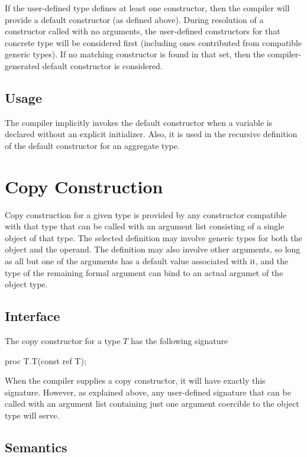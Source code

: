 If the user-defined type defines at least one constructor, then the compiler
will provide a default constructor (as defined above).  During resolution of a
constructor called with no arguments, the user-defined constructors for that
concrete type will be considered first (including ones contributed from
compatible generic types).  If no matching constructor is found in that set,
then the compiler-generated default constructor is considered.

\subsection{Usage}

The compiler implicitly invokes the default constructor when a variable is
declared without an explicit initializer.  Also, it is used in the recursive
definition of the default constructor for an aggregate type.

\section{Copy Construction}

Copy construction for a given type is provided by any constructor compatible
with that type that can be called with an argument list consisting of a single
object of that type.  The selected definition may involve generic types for both
the object and the operand.  The definition may also involve other arguments, so
long as all but one of the arguments has a default value associated with it, and
the type of the remaining formal argument can bind to an actual argumet of the
object type.

\subsection{Interface}

The copy constructor for a type $T$ has the following signature
\begin{chapel}
proc T.T(const ref T);
\end{chapel}
When the compiler supplies a copy constructor, it will have exactly this
signature.  However, as explained above, any user-defined signature that can be
called with an argument list containing just one argument coercible to the
object type will serve.

\subsection{Semantics}

